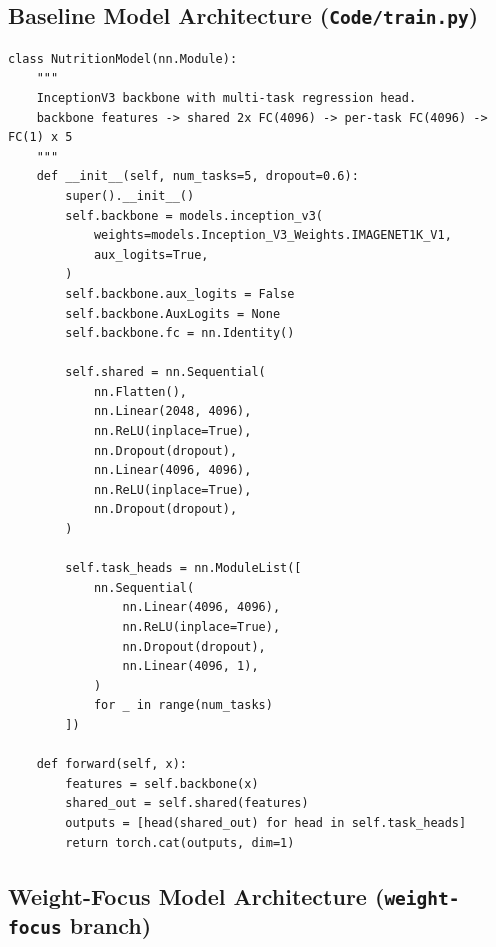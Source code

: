 \documentclass[11pt,a4paper]{article}
\begin{document}
\subsection{Baseline Model Architecture (\texttt{Code/train.py})}

\begin{lstlisting}[caption={NutritionModel class --- Baseline CNN architecture.}]
class NutritionModel(nn.Module):
    """
    InceptionV3 backbone with multi-task regression head.
    backbone features -> shared 2x FC(4096) -> per-task FC(4096) -> FC(1) x 5
    """
    def __init__(self, num_tasks=5, dropout=0.6):
        super().__init__()
        self.backbone = models.inception_v3(
            weights=models.Inception_V3_Weights.IMAGENET1K_V1,
            aux_logits=True,
        )
        self.backbone.aux_logits = False
        self.backbone.AuxLogits = None
        self.backbone.fc = nn.Identity()

        self.shared = nn.Sequential(
            nn.Flatten(),
            nn.Linear(2048, 4096),
            nn.ReLU(inplace=True),
            nn.Dropout(dropout),
            nn.Linear(4096, 4096),
            nn.ReLU(inplace=True),
            nn.Dropout(dropout),
        )

        self.task_heads = nn.ModuleList([
            nn.Sequential(
                nn.Linear(4096, 4096),
                nn.ReLU(inplace=True),
                nn.Dropout(dropout),
                nn.Linear(4096, 1),
            )
            for _ in range(num_tasks)
        ])

    def forward(self, x):
        features = self.backbone(x)
        shared_out = self.shared(features)
        outputs = [head(shared_out) for head in self.task_heads]
        return torch.cat(outputs, dim=1)
\end{lstlisting}

\subsection{Weight-Focus Model Architecture (\texttt{weight-focus} branch)}
\end{document}

